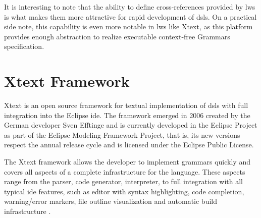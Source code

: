 It is interesting to note that the ability to define cross-references provided by \acp{lw} is what makes them more attractive for rapid development of \acp{dsl}. On a practical side note, this capability is even more notable in \acp{lw} like Xtext, as this platform provides enough abstraction to realize executable context-free Grammars specification.

\section{Xtext Framework}
\label{sec_back:xtext}

Xtext is an open source framework for textual implementation of \acp{dsl} with full integration into the Eclipse \ac{ide}.
The framework emerged in 2006 created by the German developer Sven Efftinge and is currently developed in the Eclipse Project as part of the Eclipse Modeling Framework Project, that is, its new versions respect the annual release cycle and is licensed under the Eclipse Public License.

The Xtext framework allows the developer to implement grammars quickly and covers all aspects of a complete infrastructure for the language.
These aspects range from the parser, code generator, interpreter, to full integration with all typical \ac{ide} features, such as editor with syntax highlighting, code completion, warning/error markers, file outline visualization and automatic build infrastructure \cite{Bettini:2016}.

